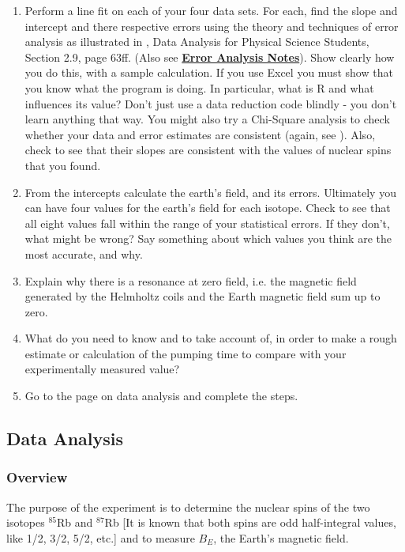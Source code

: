 \documentclass{../lab}
\begin{document}
\begin{enumerate}
    \item Perform a line fit on each of your four data sets. For each, find the slope and intercept and there respective errors using the theory and techniques of error analysis as illustrated in \citeauthor{Lyons}, Data Analysis for Physical Science Students, Section 2.9, page 63ff. (Also see \href{\ErrorAnalysisNotes}{\textbf{Error Analysis Notes}}). Show clearly how you do this, with a sample calculation. If you use Excel you must show that you know what the program is doing. In particular, what is R and what influences its value? Don't just use a data reduction code blindly - you don't learn anything that way. You might also try a Chi-Square analysis to check whether your data and error estimates are consistent (again, see \citeauthor{Lyons}). Also, check to see that their slopes are consistent with the values of nuclear spins that you found.

    \item From the intercepts calculate the earth's field, and its errors. Ultimately you can have four values for the earth's field for each isotope. Check to see that all eight values fall within the range of your statistical errors. If they don't, what might be wrong? Say something about which values you think are the most accurate, and why.

    \item Explain why there is a resonance at zero field, i.e. the magnetic field generated by the Helmholtz coils and the Earth magnetic field sum up to zero.

    \item What do you need to know and to take account of, in order to make a rough estimate or calculation of the pumping time to compare with your experimentally measured value?

    \item Go to the page on data analysis and complete the steps.
\end{enumerate}

\subsection{Data Analysis}

\subsubsection{Overview}

The purpose of the experiment is to determine the nuclear spins of the two isotopes $^{85}$Rb and $^{87}$Rb [It is known that both spins are odd half-integral values, like 1/2, 3/2, 5/2, etc.] and to measure $B_{E}$, the Earth's magnetic field. \\
\end{document}
